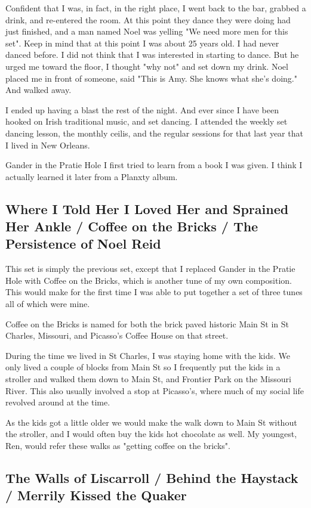 \documentclass[9pt,letterpaper]{article}
\begin{document}
{Confident that I was, in fact, in the right place, I went back to the bar, grabbed a drink, and re-entered the room. At this point they dance they were doing had just finished, and a man named Noel was yelling "We need more men for this set". Keep in mind that at this point I was about 25 years old. I had never danced before. I did not think that I was interested in starting to dance. But he urged me toward the floor, I thought "why not" and set down my drink. Noel placed me in front of someone, said "This is Amy. She knows what she's doing." And walked away.

I ended up having a blast the rest of the night. And ever since I have been hooked on Irish traditional music, and set dancing. I attended the weekly set dancing lesson, the monthly ceilis, and the regular sessions for that last year that I lived in New Orleans.

Gander in the Pratie Hole I first tried to learn from a book I was given. I think I actually learned it later from a Planxty album.

\subsection{Where I Told Her I Loved Her and Sprained Her Ankle / Coffee on the Bricks / The Persistence of Noel Reid}

This set is simply the previous set, except that I replaced Gander in the Pratie Hole with Coffee on the Bricks, which is another tune of my own composition. This would make for the first time I was able to put together a set of three tunes all of which were mine.

Coffee on the Bricks is named for both the brick paved historic Main St in St Charles, Missouri, and Picasso's Coffee House on that street.

During the time we lived in St Charles, I was staying home with the kids. We only lived a couple of blocks from Main St so I frequently put the kids in a stroller and walked them down to Main St, and Frontier Park on the Missouri River. This also usually involved a stop at Picasso's, where much of my social life revolved around at the time.

As the kids got a little older we would make the walk down to Main St without the stroller, and I would often buy the kids hot chocolate as well. My youngest, Ren, would refer these walks as "getting coffee on the bricks".

\subsection{The Walls of Liscarroll / Behind the Haystack / Merrily Kissed the Quaker}

}
\end{document}
